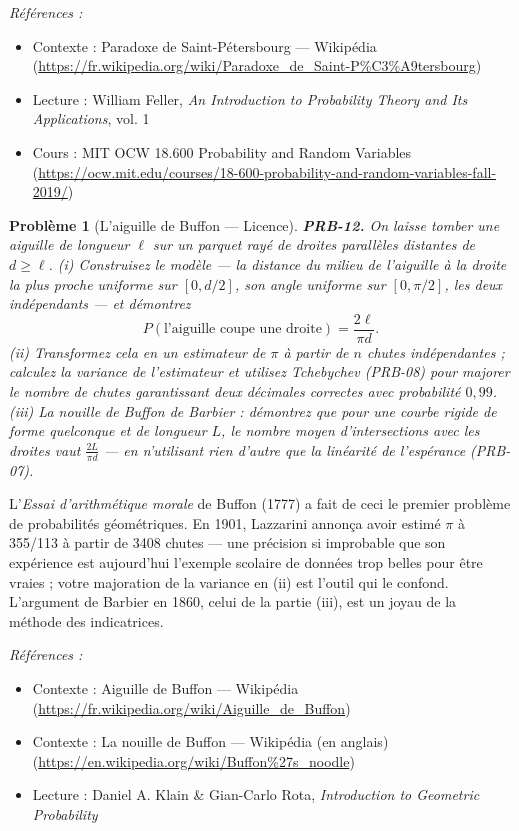 \documentclass[11pt]{article}
\newtheorem{problem}{Problème}
\newenvironment{refs}{\par\small\noindent\emph{Références :}\begin{itemize}\setlength\itemsep{0pt}}{\end{itemize}\normalsize}
\begin{document}
\begin{refs}
\item Contexte : Paradoxe de Saint-Pétersbourg --- Wikipédia (\url{https://fr.wikipedia.org/wiki/Paradoxe_de_Saint-P%C3%A9tersbourg})
\item Lecture : William Feller, \textit{An Introduction to Probability Theory and Its Applications}, vol. 1
\item Cours : MIT OCW 18.600 Probability and Random Variables (\url{https://ocw.mit.edu/courses/18-600-probability-and-random-variables-fall-2019/})
\end{refs}

\bigskip

\begin{problem}[{L'aiguille de Buffon --- Licence}]
\textbf{PRB-12.} On laisse tomber une aiguille de longueur $ \ell $ sur un
parquet rayé de droites parallèles distantes de $ d \ge \ell $. (i) Construisez le modèle --- la
distance du milieu de l'aiguille à la droite la plus proche uniforme sur $ [0, d/2] $, son angle
uniforme sur $ [0, \pi/2] $, les deux indépendants --- et démontrez
\[ P(\text{l'aiguille coupe une droite}) = \frac{2\ell}{\pi d}. \]
(ii) Transformez cela en un estimateur de $\pi$ à partir de $ n $ chutes indépendantes ; calculez la
variance de l'estimateur et utilisez Tchebychev (PRB-08) pour majorer le nombre de chutes
garantissant deux décimales correctes avec probabilité $ 0{,}99 $. (iii) La \og{} nouille de
Buffon \fg{} de Barbier : démontrez que pour une courbe rigide de forme quelconque et de longueur
$ L $, le \textit{nombre moyen} d'intersections avec les droites vaut $ \frac{2L}{\pi d} $ --- en
n'utilisant rien d'autre que la linéarité de l'espérance (PRB-07).
\end{problem}

\noindent L'\textit{Essai d'arithmétique morale} de Buffon (1777) a fait de ceci le premier
problème de probabilités géométriques. En 1901, Lazzarini annonça avoir estimé $\pi$ à 355/113 à
partir de 3408 chutes --- une précision si improbable que son expérience est aujourd'hui l'exemple
scolaire de données trop belles pour être vraies ; votre majoration de la variance en (ii) est
l'outil qui le confond. L'argument de Barbier en 1860, celui de la partie (iii), est un joyau de
la méthode des indicatrices.

\begin{refs}
\item Contexte : Aiguille de Buffon --- Wikipédia (\url{https://fr.wikipedia.org/wiki/Aiguille_de_Buffon})
\item Contexte : La nouille de Buffon --- Wikipédia (en anglais) (\url{https://en.wikipedia.org/wiki/Buffon%27s_noodle})
\item Lecture : Daniel A. Klain \& Gian-Carlo Rota, \textit{Introduction to Geometric Probability}
\end{refs}
\end{document}
